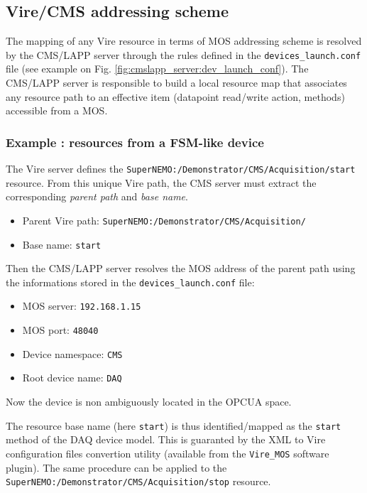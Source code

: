 

\subsection{Vire/CMS addressing scheme}

The mapping of any Vire resource  in terms of MOS addressing scheme is
resolved  by the  CMS/LAPP server  through  the rules  defined in  the
\verb|devices_launch.conf|     file    (see     example    on     Fig.
\ref{fig:cmslapp_server:dev_launch_conf}).   The  CMS/LAPP  server  is
responsible to build a local resource map that associates any resource
path  to  an effective  item  (datapoint  read/write action,  methods)
accessible from a MOS.

\subsubsection{Example : resources from a FSM-like device}

The Vire server defines the  \verb|SuperNEMO:/Demonstrator/CMS/Acquisition/start| resource.
From this unique Vire path, the CMS server must extract the
corresponding \emph{parent path} and \emph{base name}.

\begin{itemize}
\item Parent Vire path:  \verb|SuperNEMO:/Demonstrator/CMS/Acquisition/|
\item Base name:  \verb|start|
\end{itemize}

Then the CMS/LAPP server resolves the MOS address of the parent path using the informations
stored in the \verb|devices_launch.conf| file:
\begin{itemize}
\item MOS server: \texttt{192.168.1.15}
\item MOS port: \texttt{48040}
\item Device namespace: \texttt{CMS}
\item Root device name: \texttt{DAQ}
\end{itemize}

Now the device is non ambiguously located in the OPCUA space.

The resource  base name (here \verb|start|)  is thus identified/mapped
as  the  \texttt{start} method  of  the  DAQ  device model.   This  is
guaranted by  the XML to  Vire configuration files  convertion utility
(available  from the  \texttt{Vire\_MOS} software  plugin).  The  same
procedure         can         be        applied         to         the\\
\verb|SuperNEMO:/Demonstrator/CMS/Acquisition/stop| resource.

